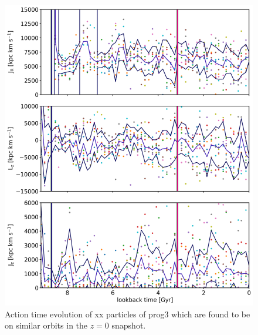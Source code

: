 \begin{figure}
\captionsetup{format=plain}
    \centering
	\includegraphics[width=\textwidth]{plots/Dynamics/prog3/action_time_evolution_box_hist_mean_prog3.png}
    \caption{Action time evolution of xx particles of prog3 which are found to be on similar orbits in the $z=0$ snapshot.}\label{fig:actions_box_time_evolution_prog3}
\end{figure}

